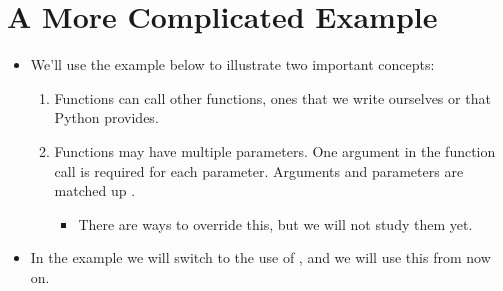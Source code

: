\documentclass[letterpaper,10pt,english]{sphinxmanual}
\begin{document}
\section{A More Complicated Example}
\label{\detokenize{lecture_notes/lec05_functions2:a-more-complicated-example}}\begin{itemize}
\item {} 
We’ll use the example below to illustrate two important concepts:
\begin{enumerate}
\def\theenumi{\arabic{enumi}}
\def\labelenumi{\theenumi .}
\makeatletter\def\p@enumii{\p@enumi \theenumi .}\makeatother
\item {} 
Functions can call other functions, ones that we write ourselves
or that Python provides.

\item {} 
Functions may have multiple parameters.  One argument in the
function call is required for each parameter. Arguments and
parameters are matched up .
\begin{itemize}
\item {} 
There are ways to override this, but we will not study them
yet.

\end{itemize}

\end{enumerate}

\item {} 
In the example we will switch to the use of , and we will
use this from now on.

\end{itemize}
\end{document}

